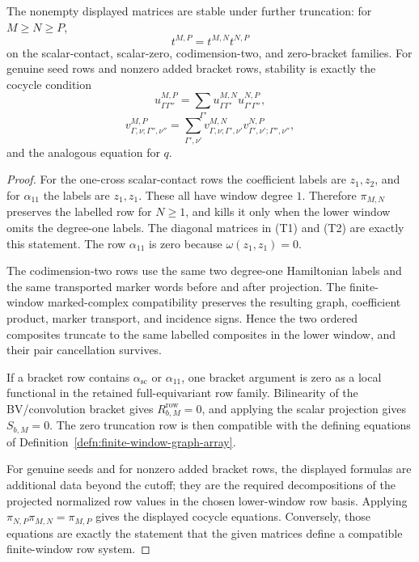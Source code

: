 \begin{prop}
  The nonempty displayed matrices are stable under further truncation:
  for \(M\geq N\geq P\),
  \[
    t^{M,P}=t^{M,N}t^{N,P}
  \]
  on the scalar-contact, scalar-zero, codimension-two, and zero-bracket
  families.  For genuine seed rows and nonzero added bracket rows, stability
  is exactly the cocycle condition
  \[
    u^{M,P}_{\Gamma\Gamma''}
      =
    \sum_{\Gamma'}u^{M,N}_{\Gamma\Gamma'}u^{N,P}_{\Gamma'\Gamma''},
  \]
  \[
    v^{M,P}_{\Gamma,\nu;\Gamma'',\nu''}
      =
    \sum_{\Gamma',\nu'}
      v^{M,N}_{\Gamma,\nu;\Gamma',\nu'}
      v^{N,P}_{\Gamma',\nu';\Gamma'',\nu''},
  \]
  and the analogous equation for \(q\).
\end{prop}

\begin{proof}
  For the one-cross scalar-contact rows the coefficient labels are
  \(z_1,z_2\), and for \(\alpha_{11}\) the labels are \(z_1,z_1\).  These
  all have window degree \(1\).  Therefore \(\pi_{M,N}\) preserves the
  labelled row for \(N\geq1\), and kills it only when the lower window
  omits the degree-one labels.  The diagonal matrices in (T1) and
  (T2) are exactly this statement.  The row \(\alpha_{11}\) is zero because
  \(\omega(z_1,z_1)=0\).

  The codimension-two rows use the same two degree-one Hamiltonian labels
  and the same transported marker words before and after projection.  The
  finite-window marked-complex compatibility preserves the resulting graph,
  coefficient product, marker transport, and incidence signs.  Hence the two
  ordered composites truncate to the same labelled composites in the lower
  window, and their pair cancellation survives.

  If a bracket row contains \(\alpha_{\mathrm{sc}}\) or \(\alpha_{11}\), one
  bracket argument is zero as a local functional in the retained
  full-equivariant row family.  Bilinearity of the BV/convolution bracket
  gives \(R^{\mathrm{row}}_{b,M}=0\), and applying the scalar projection
  gives \(S_{b,M}=0\).  The zero truncation row is then compatible with the
  defining equations of
  Definition~\ref{defn:finite-window-graph-array}.

  For genuine seeds and for nonzero added bracket rows, the displayed
  formulas are additional data beyond the cutoff; they are the required
  decompositions of the projected normalized row values in the chosen
  lower-window row basis.  Applying
  \(\pi_{N,P}\pi_{M,N}=\pi_{M,P}\) gives the displayed cocycle equations.
  Conversely, those equations are exactly the statement that the given
  matrices define a compatible finite-window row system.
\end{proof}

